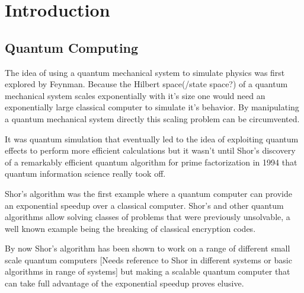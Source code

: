 \chapter{Introduction}

\section{Quantum Computing}

The idea of using a quantum mechanical system to simulate physics was first explored by Feynman\cite{Feynman1982Simulating}. Because the Hilbert space(/state space?)  of a quantum mechanical system scales  exponentially with it's size one would need an exponentially large classical computer to simulate it's behavior. By manipulating a quantum mechanical system directly this scaling problem can be circumvented.

It was quantum simulation that eventually led to the idea of exploiting quantum effects to perform more efficient calculations but it wasn't until Shor's discovery of a remarkably efficient quantum algorithm for prime factorization in 1994\citep{Shor1994Algorithms} that quantum information science really took off.

Shor's algorithm was the first example where a quantum computer can provide an exponential speedup over a classical computer. Shor's and other quantum algorithms allow solving classes of problems that were previously unsolvable, a well known example being the breaking of classical encryption codes.


By now Shor's algorithm has been shown to work on a range of different small scale quantum computers \cite{Vandersypen2001Experimental} [Needs reference to Shor in different systems or basic algorithms in range of systems] but making a scalable quantum computer that can take full advantage of the exponential speedup proves elusive.



